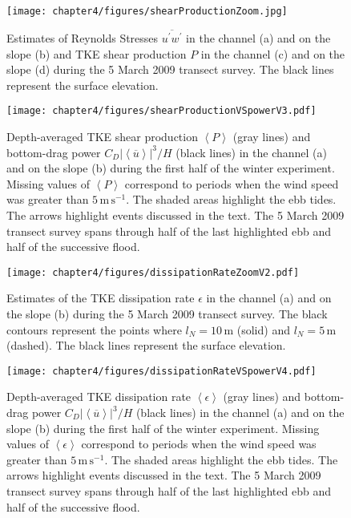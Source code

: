 \begin{figure}[t]
  \noindent
  \texttt{[image: chapter4/figures/shearProductionZoom.jpg]}\\
  \caption{Estimates of Reynolds Stresses $\overline{u^{\prime}w^{\prime}}$ in the channel (a) and on the slope (b) and TKE shear production $P$ in the channel (c) and on the slope (d) during the 5 March 2009 transect survey. The black lines represent the surface elevation.}
  \label{shearProductionZoom}
\end{figure}

\begin{figure}[t]
  \noindent
  \texttt{[image: chapter4/figures/shearProductionVSpowerV3.pdf]}\\
  \caption{Depth-averaged TKE shear production $\left\langle P \right\rangle$ (gray lines) and bottom-drag power $C_D \left| \left\langle \overline{u} \right\rangle \right|^{3}/H$ (black lines) in the channel (a) and on the slope (b) during the first half of the winter experiment. Missing values of $\left\langle P \right\rangle$ correspond to periods when the wind speed was greater than $5\, \mathrm{m\, s^{-1}}$. The shaded areas highlight the ebb tides. The arrows highlight events discussed in the text. The 5 March 2009 transect survey spans through half of the last highlighted ebb and half of the successive flood.}
  \label{shearProductionVSpower}
\end{figure}

\begin{figure}[t]
  \noindent
  \texttt{[image: chapter4/figures/dissipationRateZoomV2.pdf]}\\
  \caption{Estimates of the TKE dissipation rate $\epsilon$ in the channel (a) and on the slope (b) during the 5 March 2009 transect survey. The black contours represent the points where $l_N = 10 \, \mathrm{m}$ (solid) and  $l_N = 5 \, \mathrm{m}$ (dashed). The black lines represent the surface elevation.}
  \label{dissipationRateZoom}
\end{figure}

\begin{figure}[t]
  \noindent
  \texttt{[image: chapter4/figures/dissipationRateVSpowerV4.pdf]}\\
  \caption{Depth-averaged TKE dissipation rate $\left\langle \epsilon \right\rangle$ (gray lines) and bottom-drag power $C_D \left| \left\langle \overline{u} \right\rangle \right|^{3}/H$ (black lines) in the channel (a) and on the slope (b) during the first half of the winter experiment. Missing values of $\left\langle \epsilon \right\rangle$ correspond to periods when the wind speed was greater than $5\, \mathrm{m\, s^{-1}}$. The shaded areas highlight the ebb tides. The arrows highlight events discussed in the text. The 5 March 2009 transect survey spans through half of the last highlighted ebb and half of the successive flood.}
  \label{dissipationRateVSpower}
\end{figure}

